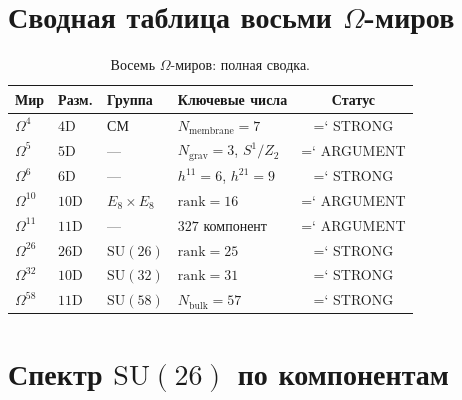 \documentclass[11pt,a4paper]{article}
\newcommand{\SU}{\mathrm{SU}}
\newcommand{\Om}{\Omega^4}
\newcommand{\Omf}{\Omega^5}
\newcommand{\Oms}{\Omega^6}
\newcommand{\Omt}{\Omega^{10}}
\newcommand{\Ome}{\Omega^{11}}
\newcommand{\Omtw}{\Omega^{26}}
\newcommand{\Omth}{\Omega^{32}}
\newcommand{\Omfi}{\Omega^{58}}
\newcommand{\Nbulk}{N_{\text{bulk}}}
\newcommand{\Nmembrane}{N_{\text{membrane}}}
\renewcommand{\texttt}[1]{{\ttfamily\hyphenchar\font=`\- #1}}
\theoremstyle{definition}
\begin{document}
\section{Сводная таблица восьми $\Omega$-миров}
\label{app:eight-worlds}

\begin{table}[htbp]
\centering
\caption{Восемь $\Omega$-миров: полная сводка.}
\label{tab:app-eight-worlds}
\begin{tabular}{llllc}
\toprule
Мир & Разм. & Группа & Ключевые числа & Статус \\
\midrule
$\Om$ & $4$D & СМ & $\Nmembrane = 7$ & \texttt{STRONG} \\
$\Omf$ & $5$D & --- & $N_{\text{grav}} = 3$, $S^1/Z_2$ & \texttt{ARGUMENT} \\
$\Oms$ & $6$D & --- & $h^{11}=6$, $h^{21}=9$ & \texttt{STRONG} \\
$\Omt$ & $10$D & $E_8 \times E_8$ & $\mathrm{rank} = 16$ & \texttt{ARGUMENT} \\
$\Ome$ & $11$D & --- & $327$ компонент & \texttt{ARGUMENT} \\
$\Omtw$ & $26$D & $\SU(26)$ & $\mathrm{rank} = 25$ & \texttt{STRONG} \\
$\Omth$ & $10$D & $\SU(32)$ & $\mathrm{rank} = 31$ & \texttt{STRONG} \\
$\Omfi$ & $11$D & $\SU(58)$ & $\Nbulk = 57$ & \texttt{STRONG} \\
\bottomrule
\end{tabular}
\end{table}

\section{Спектр $\SU(26)$ по компонентам}
\label{app:su26-spectrum}
\end{document}
